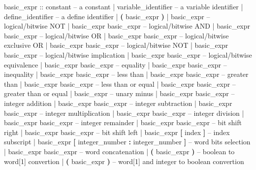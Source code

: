 \begin{Grammar}
basic_expr ::
       constant                  \footnotesize{-- a constant}
      | variable_identifier          \footnotesize{-- a variable identifier}
      | define_identifier            \footnotesize{-- a define identifier}
      | \textbf{(} basic_expr \textbf{)}
      | \operator{!} basic_expr              \footnotesize{-- logical/bitwise NOT}
      | basic_expr \operator{\&} basic_expr    \footnotesize{-- logical/bitwise AND}
      | basic_expr \operator{|} basic_expr    \footnotesize{-- logical/bitwise OR}
      | basic_expr  basic_expr  \footnotesize{-- logical/bitwise exclusive OR}
      | basic_expr  basic_expr \footnotesize{-- logical/bitwise NOT }
      | basic_expr \operator{->} basic_expr   \footnotesize{-- logical/bitwise implication}
      | basic_expr \operator{<->} basic_expr  \footnotesize{-- logical/bitwise equivalence}
      | basic_expr \operator{=} basic_expr    \footnotesize{-- equality}
      | basic_expr \operator{!=} basic_expr   \footnotesize{-- inequality}
      | basic_expr \operator{<} basic_expr    \footnotesize{-- less than}
      | basic_expr \operator{>} basic_expr    \footnotesize{-- greater than}
      | basic_expr \operator{<=} basic_expr   \footnotesize{-- less than or equal}
      | basic_expr \operator{>=} basic_expr   \footnotesize{-- greater than or equal}
      | \operator{-} basic_expr              \footnotesize{-- unary minus}
      | basic_expr \operator{+} basic_expr    \footnotesize{-- integer addition}
      | basic_expr \operator{-} basic_expr    \footnotesize{-- integer subtraction}
      | basic_expr \operator{*} basic_expr    \footnotesize{-- integer multiplication}
      | basic_expr \operator{/} basic_expr    \footnotesize{-- integer division}
      | basic_expr  basic_expr  \footnotesize{-- integer remainder}
      | basic_expr \operator{>>} basic_expr   \footnotesize{-- bit shift right}
      | basic_expr \operator{<<} basic_expr   \footnotesize{-- bit shift left}
      | basic_expr \textbf{[} index \textbf{]}         -- index subscript
      | basic_expr \textbf{[} integer_number \textbf{:} integer_number \textbf{]}
                                     \footnotesize{-- word bits selection}
      | basic_expr \operator{::} basic_expr   \footnotesize{-- word concatenation}
      |  \textbf{(} basic_expr \textbf{)} 
                                 \footnotesize{-- boolean to word[1] convertion}
      |  \textbf{(} basic_expr \textbf{)}  
                                 \footnotesize{-- word[1] and integer to boolean convertion}

\end{Grammar}
